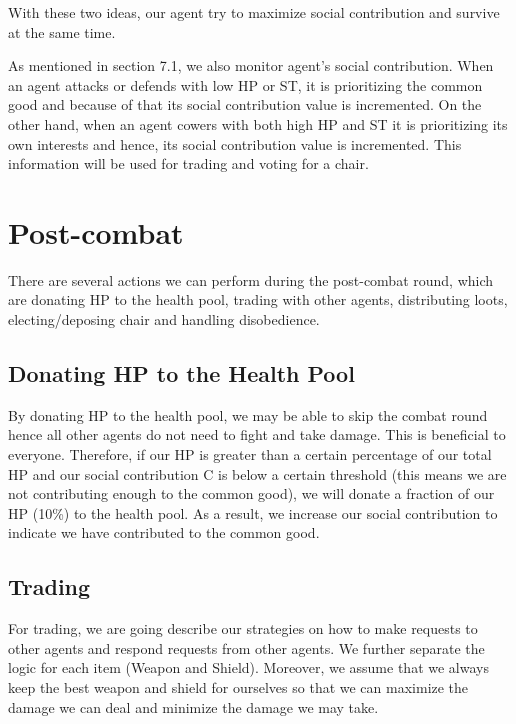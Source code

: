 \par With these two ideas, our agent try to maximize social contribution and survive at the same time.

\par As mentioned in section 7.1, we also monitor agent's social contribution. When an agent attacks or defends with low HP or ST, it is prioritizing the common good and because of that its social contribution value is incremented. On the other hand, when an agent cowers with both high HP and ST it is prioritizing its own interests and hence, its social contribution value is incremented. This information will be used for trading and voting for a chair.

\section{Post-combat}

\par There are several actions we can perform during the post-combat round, which are donating HP to the health pool, trading with other agents, distributing loots, electing/deposing chair and handling disobedience.

\subsection{Donating HP to the Health Pool}

\par By donating HP to the health pool, we may be able to skip the combat round hence all other agents do not need to fight and take damage. This is beneficial to everyone. Therefore, if our HP is greater than a certain percentage of our total HP and our social contribution C is below a certain threshold (this means we are not contributing enough to the common good), we will donate a fraction of our HP (10\%) to the health pool. As a result, we increase our social contribution to indicate we have contributed to the common good. 

\subsection{Trading}

\par For trading, we are going describe our strategies on how to make requests to other agents and respond requests from other agents. We further separate the logic for each item (Weapon and Shield). Moreover, we assume that we always keep the best weapon and shield for ourselves so that we can maximize the damage we can deal and minimize the damage we may take. 

